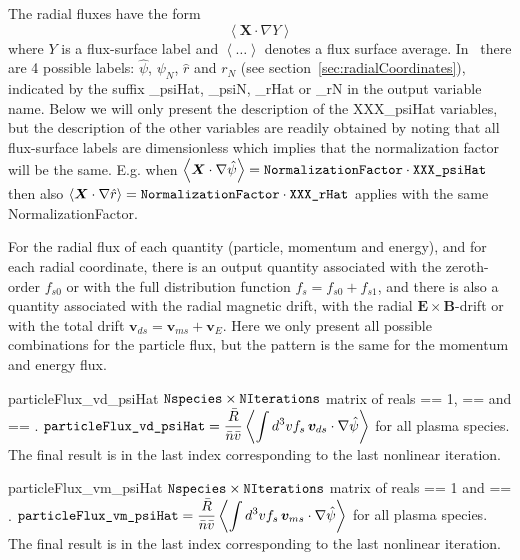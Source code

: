 The radial fluxes have the form 
\[
\left\langle \bm{X} \cdot \nabla Y \right\rangle
\]
where $Y$ is a flux-surface label and $\left< \ldots \right>$ denotes a flux surface average. In \sfincs~there are 4 possible labels: $\hat{\psi}$, $\psi_N$, $\hat{r}$ and $r_N$ (see section~\ref{sec:radialCoordinates}), indicated by the suffix {\ttfamily \_psiHat}, {\ttfamily \_psiN}, {\ttfamily \_rHat} or {\ttfamily \_rN} in the output variable name. 
Below we will only present the description of the {\ttfamily XXX\_psiHat} variables, but the description of the other variables are readily obtained by noting that 
all flux-surface labels are dimensionless which implies that the normalization factor will be the same. E.g. when $\displaystyle \left\langle \bm{X} \cdot \nabla \hat{\psi} \right\rangle = \text{\ttfamily NormalizationFactor} \cdot \text{\ttfamily XXX\_psiHat}$ then also $\displaystyle \left\langle \bm{X} \cdot \nabla \hat{r} \right\rangle = \text{\ttfamily NormalizationFactor} \cdot \text{\ttfamily XXX\_rHat}$ applies with the same {\ttfamily NormalizationFactor}. 

For the radial flux of each quantity (particle, momentum and energy), and for each radial coordinate, there is an output quantity associated with the zeroth-order $f_{s0}$ or with the full distribution function $f_s = f_{s0} + f_{s1}$, and there is also a quantity associated with the radial magnetic drift, with the radial $\bm{E} \times \bm{B}$-drift or with the total drift $\bm{v}_{ds} = \bm{v}_{ms} + \bm{v}_{E}$. Here we only present all possible combinations for the particle flux, but the pattern is the same for the momentum and energy flux. 

\myhrule

{particleFlux_vd_psiHat}
{$\text{\ttfamily Nspecies} \times \text{\ttfamily NIterations}$ matrix of reals}
{ == 1,  == \true and  == \true.}
{$\displaystyle \text{\ttfamily particleFlux\_vd\_psiHat} = \frac{\bar{R}}{\bar{n} \bar{v}} \left\langle \int d^3v f_s \, \bm{v}_{ds} \cdot \nabla \hat{\psi}\right\rangle$ for all plasma species. The final result is in the last index corresponding to the last nonlinear iteration.}

\myhrule

{particleFlux_vm_psiHat}
{$\text{\ttfamily Nspecies} \times \text{\ttfamily NIterations}$ matrix of reals}
{ == 1 and  == \true.}
{$\displaystyle \text{\ttfamily particleFlux\_vm\_psiHat} = \frac{\bar{R}}{\bar{n} \bar{v}} \left\langle \int d^3v f_s \, \bm{v}_{ms} \cdot \nabla \hat{\psi}\right\rangle$ for all plasma species. The final result is in the last index corresponding to the last nonlinear iteration.}

